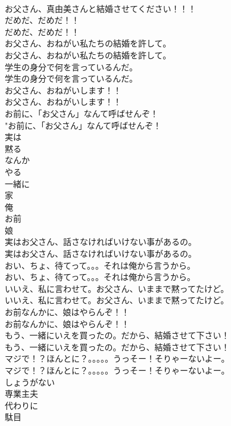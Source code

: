 \documentclass[8pt]{extreport}
\begin{document}
\begin{CJK}{UTF8}{min}
\\	お父さん、真由美さんと結婚させてください！！！ 
\\	だめだ、だめだ！！	
\\	だめだ、だめだ！！ 
\\	お父さん、おねがい私たちの結婚を許して。	
\\	お父さん、おねがい私たちの結婚を許して。 
\\	学生の身分で何を言っているんだ。	
\\	学生の身分で何を言っているんだ。 
\\	お父さん、おねがいします！！	
\\	お父さん、おねがいします！！ 
\\	お前に、「お父さん」なんて呼ばせんぞ！	
\\	"お前に、「お父さん」なんて呼ばせんぞ！ 
\\	実は
\\	黙る
\\	なんか
\\	やる
\\	一緒に
\\	家
\\	俺
\\	お前
\\	娘
\\	実はお父さん、話さなければいけない事があるの。	
\\	実はお父さん、話さなければいけない事があるの。 
\\	おい、ちょ、待てって。。。それは俺から言うから。	
\\	おい、ちょ、待てって。。。それは俺から言うから。 
\\	いいえ、私に言わせて。お父さん、いままで黙ってたけど。	
\\	いいえ、私に言わせて。お父さん、いままで黙ってたけど。 
\\	お前なんかに、娘はやらんぞ！！	
\\	お前なんかに、娘はやらんぞ！！ 
\\	もう、一緒にいえを買ったの。だから、結婚させて下さい！	
\\	もう、一緒にいえを買ったの。だから、結婚させて下さい！ 
\\	マジで！？ほんとに？。。。。。うっそー！そりゃーないよー。	
\\	マジで！？ほんとに？。。。。。うっそー！そりゃーないよー。 
\\	しょうがない
\\	専業主夫
\\	代わりに
\\	駄目

\end{CJK}
\end{document}
